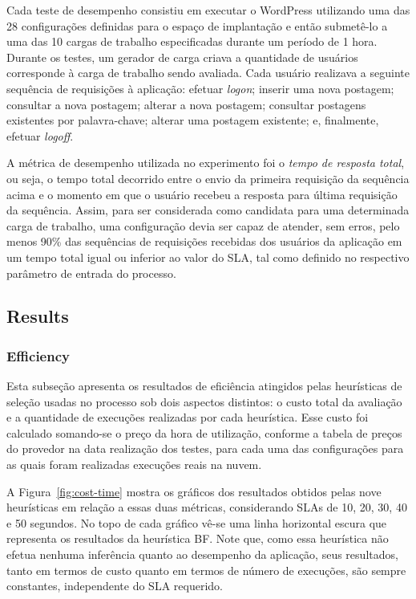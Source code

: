 \documentclass[10pt,conference,compsocconf]{IEEEtran}
\begin{document}
Cada teste de desempenho consistiu em executar o WordPress utilizando uma das 28 configurações definidas para o espaço de implantação e então submetê-lo a uma das 10 cargas de trabalho especificadas durante um período de 1 hora. Durante os testes, um gerador de carga criava a quantidade de usuários corresponde à carga de trabalho sendo avaliada. Cada usuário realizava a seguinte sequência de requisições à aplicação: efetuar \emph{logon}; inserir uma nova postagem; consultar a nova postagem; alterar a nova postagem; consultar postagens existentes por palavra-chave; alterar uma postagem existente; e, finalmente, efetuar \emph{logoff}. 

A métrica de desempenho utilizada no experimento foi o {\em tempo de resposta total}, ou 
seja, o tempo total decorrido entre o envio da primeira requisição da sequência 
acima e o momento em que o usuário recebeu a resposta para última requisição da
sequência. Assim, para ser considerada como candidata para uma determinada carga de trabalho, uma configuração devia ser capaz de atender, sem erros, pelo menos  90\% das sequências de requisições recebidas dos usuários da aplicação em um tempo total igual ou inferior ao valor do SLA, tal como definido no respectivo parâmetro de entrada do processo.

\subsection{Results}

\subsubsection{Efficiency}
Esta subseção apresenta os resultados de eficiência atingidos pelas heurísticas
de seleção usadas no processo sob dois aspectos distintos: o custo total da avaliação e a quantidade de execuções realizadas por cada heurística. Esse custo foi calculado somando-se o preço da hora de utilização, conforme a tabela de preços do provedor na data realização dos testes, para cada uma das configurações para as quais foram realizadas execuções reais na nuvem. 

A Figura~\ref{fig:cost-time} mostra os gráficos dos resultados obtidos pelas
nove heurísticas em relação a essas duas métricas, considerando SLAs 
de 10, 20, 30, 40 e 50 segundos. No topo de cada gráfico vê-se uma linha horizontal
escura que representa os resultados da heurística BF. Note que, como essa heurística não efetua nenhuma inferência quanto ao desempenho da aplicação, seus resultados, tanto em termos de custo quanto em termos de número de execuções, são sempre constantes, independente do SLA requerido.
\end{document}
